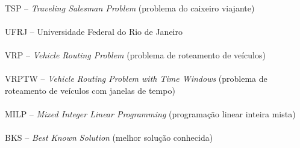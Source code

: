\paragraph{}TSP -- \textit{Traveling Salesman Problem} (problema do caixeiro viajante)
\paragraph{}UFRJ -- Universidade Federal do Rio de Janeiro
\paragraph{}VRP -- \textit{Vehicle Routing Problem} (problema de roteamento de veículos)
\paragraph{}VRPTW -- \textit{Vehicle Routing Problem with Time Windows} (problema de roteamento de veículos com janelas de tempo)
\paragraph{}MILP -- \textit{Mixed Integer Linear Programming} (programação linear inteira mista)
\paragraph{}BKS -- \textit{Best Known Solution} (melhor solução conhecida)

\pagebreak







